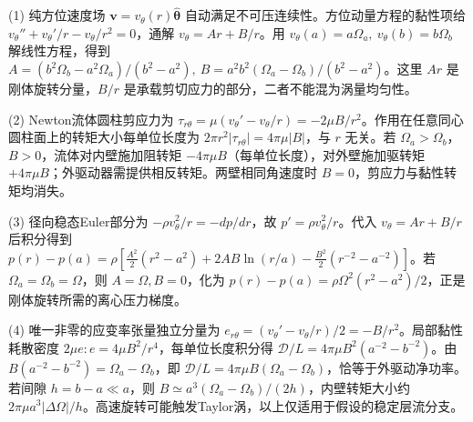 (1) 纯方位速度场 \(\boldsymbol v=v_\theta(r)\hat{\boldsymbol\theta}\) 自动满足不可压连续性。方位动量方程的黏性项给 \(v_\theta''+v_\theta'/r-v_\theta/r^2=0\)，通解 \(v_\theta=Ar+B/r\)。用 \(v_\theta(a)=a\Omega_a,\ v_\theta(b)=b\Omega_b\) 解线性方程，得到 \(\boxed{A=(b^2\Omega_b-a^2\Omega_a)/(b^2-a^2),\ B=a^2b^2(\Omega_a-\Omega_b)/(b^2-a^2)}\)。这里 \(Ar\) 是刚体旋转分量，\(B/r\) 是承载剪切应力的部分，二者不能混为涡量均匀性。

(2) Newton流体圆柱剪应力为 \(\tau_{r\theta}=\mu(v_\theta'-v_\theta/r)=-2\mu B/r^2\)。作用在任意同心圆柱面上的转矩大小每单位长度为 \(2\pi r^2|\tau_{r\theta}|=4\pi\mu|B|\)，与 \(r\) 无关。若 \(\Omega_a>\Omega_b\)，\(B>0\)，流体对内壁施加阻转矩 \(-4\pi\mu B\)（每单位长度），对外壁施加驱转矩 \(+4\pi\mu B\)；外驱动器需提供相反转矩。两壁相同角速度时 \(B=0\)，剪应力与黏性转矩均消失。

(3) 径向稳态Euler部分为 \(-\rho v_\theta^2/r=-dp/dr\)，故 \(p'=\rho v_\theta^2/r\)。代入 \(v_\theta=Ar+B/r\) 后积分得到 \(\boxed{p(r)-p(a)=\rho[\frac{A^2}{2}(r^2-a^2)+2AB\ln(r/a)-\frac{B^2}{2}(r^{-2}-a^{-2})]}\)。若 \(\Omega_a=\Omega_b=\Omega\)，则 \(A=\Omega,B=0\)，化为 \(p(r)-p(a)=\rho\Omega^2(r^2-a^2)/2\)，正是刚体旋转所需的离心压力梯度。

(4) 唯一非零的应变率张量独立分量为 \(e_{r\theta}=(v_\theta'-v_\theta/r)/2=-B/r^2\)。局部黏性耗散密度 \(2\mu e:e=4\mu B^2/r^4\)，每单位长度积分得 \(\mathcal D/L=4\pi\mu B^2(a^{-2}-b^{-2})\)。由 \(B(a^{-2}-b^{-2})=\Omega_a-\Omega_b\)，即 \(\boxed{\mathcal D/L=4\pi\mu B(\Omega_a-\Omega_b)}\)，恰等于外驱动净功率。若间隙 \(h=b-a\ll a\)，则 \(B\simeq a^3(\Omega_a-\Omega_b)/(2h)\)，内壁转矩大小约 \(2\pi\mu a^3|\Delta\Omega|/h\)。高速旋转可能触发Taylor涡，以上仅适用于假设的稳定层流分支。
